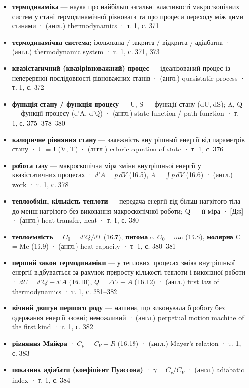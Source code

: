 \documentclass[11pt,a4paper,oneside]{book}
\newcommand{\book}{}
\begin{document}
\begin{itemize}
\item \textbf{термодинаміка} — наука про найбільш загальні властивості макроскопічних систем у стані термодинамічної рівноваги та про процеси переходу між цими станами · (англ.) thermodynamics · \book{} т. 1, с. 371
\item \textbf{термодинамічна система}; ізольована / закрита / відкрита / адіабатна · (англ.) thermodynamic system · \book{} т. 1, с. 371, 373
\item \textbf{квазістатичний (квазірівноважний) процес} — ідеалізований процес із неперервної послідовності рівноважних станів · (англ.) quasistatic process · \book{} т. 1, с. 372
\item \textbf{функція стану / функція процесу} — U, S — функції стану (dU, dS); A, Q — функції процесу (d'A, d'Q) · (англ.) state function / path function · \book{} т. 1, с. 375, 378–380
\item \textbf{калоричне рівняння стану} — залежність внутрішньої енергії від параметрів стану · U = U(V, T) · (англ.) caloric equation of state · \book{} т. 1, с. 376
\item \textbf{робота газу} — макроскопічна міра зміни внутрішньої енергії у квазістатичних процесах · $d\text{'}A = p\,dV$ (16.5), $A = \int p\,dV$ (16.6) · (англ.) work · \book{} т. 1, с. 378
\item \textbf{теплообмін, кількість теплоти} — передача енергії від більш нагрітого тіла до менш нагрітого без виконання макроскопічної роботи; Q — її міра · [Дж] · (англ.) heat transfer, heat · \book{} т. 1, с. 380
\item \textbf{теплоємність} · $C_0 = d\text{'}Q/dT$ (16.7); \textbf{питома} c: $C_0 = mc$ (16.8); \textbf{молярна} C = Mc (16.9) · (англ.) heat capacity · \book{} т. 1, с. 380–381
\item \textbf{перший закон термодинаміки} — у теплових процесах зміна внутрішньої енергії відбувається за рахунок приросту кількості теплоти і виконаної роботи · $dU = d\text{'}Q - d\text{'}A$ (16.10), $Q = \Delta U + A$ (16.12) · (англ.) first law of thermodynamics · \book{} т. 1, с. 381–382
\item \textbf{вічний двигун першого роду} — машина, що виконувала б роботу без одержання енергії ззовні; неможливий · (англ.) perpetual motion machine of the first kind · \book{} т. 1, с. 382
\item \textbf{рівняння Майєра} · $C_p = C_V + R$ (16.19) · (англ.) Mayer's relation · \book{} т. 1, с. 383
\item \textbf{показник адіабати (коефіцієнт Пуассона)} · $\gamma = C_p/C_V$ · (англ.) adiabatic index · \book{} т. 1, с. 384

\end{itemize}
\end{document}
